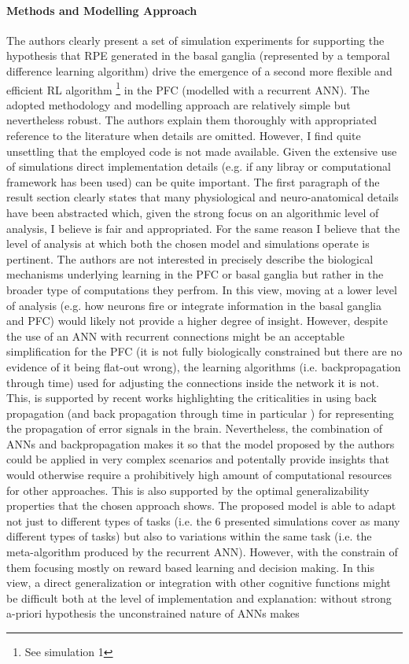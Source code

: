 \documentclass{article}
\begin{document}
\paragraph{Methods and Modelling Approach}
\label{methods}
The authors clearly present a set of simulation experiments for supporting the hypothesis that RPE generated in the basal ganglia (represented by a temporal difference learning algorithm) drive the emergence of a second more flexible and efficient RL algorithm \footnote{See simulation 1} in the PFC (modelled with a recurrent ANN). The adopted methodology and modelling approach are relatively simple but nevertheless robust. The authors explain them thoroughly with appropriated reference to the literature when details are omitted. However, I find quite unsettling that the employed code is not made available. Given the extensive use of simulations direct implementation details (e.g. if any libray or computational framework has been used) can be quite important. The first paragraph of the result section clearly states that many physiological and neuro-anatomical details have been abstracted which, given the strong focus on an algorithmic level of analysis, I believe is fair and appropriated. For the same reason I believe that the level of analysis at which both the chosen model and simulations operate is pertinent. The authors are not interested in precisely describe the biological mechanisms underlying learning in the PFC or basal ganglia but rather in the broader type of computations they perfrom. In this view, moving at a lower level of analysis (e.g. how neurons fire or integrate information in the basal ganglia and PFC) would likely not provide a higher degree of insight. However, despite the use of an ANN with recurrent connections might be an acceptable simplification for the PFC (it is not fully biologically constrained but there are no evidence of it being flat-out wrong), the learning algorithms (i.e. backpropagation through time) used for adjusting the connections inside the network it is not. This, is supported by recent works highlighting the criticalities in using back propagation \cite{whittington2019theories} (and back propagation through time in particular \cite{lillicrap2019backpropagation}) for representing the propagation of error signals in the brain. Nevertheless, the combination of ANNs and backpropagation makes it so that the model proposed by the authors could be applied in very complex scenarios and potentally provide insights that would otherwise require a prohibitively high amount of computational resources for other approaches. This is also supported by the optimal generalizability properties that the chosen approach shows. The proposed model is able to adapt not just to different types of tasks (i.e. the 6 presented simulations cover as many different types of tasks) but also to variations within the same task (i.e. the meta-algorithm produced by the recurrent ANN). However, with the constrain of them focusing mostly on reward based learning and decision making. In this view, a direct generalization or integration with other cognitive functions might be difficult both at the level of implementation and explanation: without strong a-priori hypothesis the unconstrained nature of ANNs makes 
\end{document}
